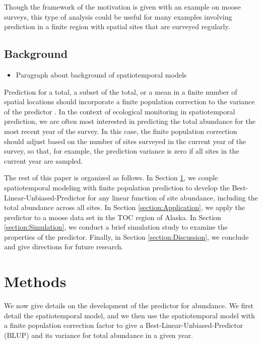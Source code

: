 \documentclass[]{interact}
\theoremstyle{plain}%
\theoremstyle{definition}
\theoremstyle{remark}
\def\tightlist{}
\begin{document}
Though the framework of the motivation is given with an example on moose
surveys, this type of analysis could be useful for many examples
involving prediction in a finite region with spatial sites that are
surveyed regularly.

\subsection{Background}

\begin{itemize}
\tightlist
\item
  Paragraph about background of spatiotemporal models
\end{itemize}

Prediction for a total, a subset of the total, or a mean in a finite
number of spatial locations should incorporate a finite population
correction to the variance of the predictor
\citep{ver2008spatial, higham2021adjusting}. In the context of
ecological monitoring in spatiotemporal prediction, we are often most
interested in predicting the total abundance for the most recent year of
the survey. In this case, the finite population correction should adjust
based on the number of sites surveyed in the current year of the survey,
so that, for example, the prediction variance is zero if all sites in
the current year are sampled.

The rest of this paper is organized as follows. In Section
\ref{section:Methods}, we couple spatiotemporal modeling with finite
population prediction to develop the Best-Linear-Unbiased-Predictor for
any linear function of site abundance, including the total abundance
across all sites. In Section \ref{section:Application}, we apply the
predictor to a moose data set in the TOC region of Alaska. In Section
\ref{section:Simulation}, we conduct a brief simulation study to examine
the properties of the predictor. Finally, in Section
\ref{section:Discussion}, we conclude and give directions for future
research.

\section{Methods} \label{section:Methods}

We now give details on the development of the predictor for abundance.
We first detail the spatiotemporal model, and we then use the
spatiotemporal model with a finite population correction factor to give
a Best-Linear-Unbiased-Predictor (BLUP) and its variance for total
abundance in a given year.
\end{document}
